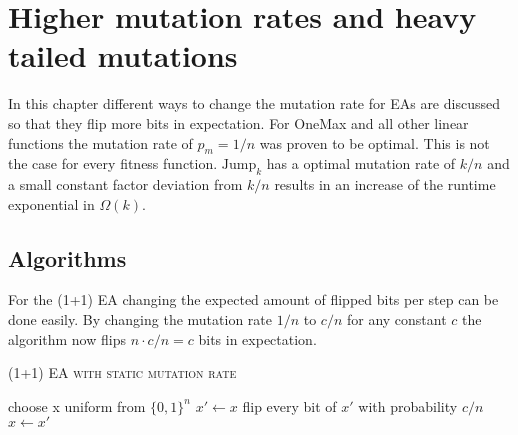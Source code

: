 \chapter{Higher mutation rates and heavy tailed mutations}\label{ch:heavyMut}

In this chapter different ways to change the mutation rate for EAs are discussed so that they flip more bits in expectation.
For OneMax and all other linear functions the mutation rate of $p_m=1/n$ was proven to be optimal\cite{witt2013tight}.
This is not the case for every fitness function.
$\text{Jump}_k$ has a optimal mutation rate of $k/n$ and a small constant factor deviation from $k/n$ results in an increase of the runtime exponential in $\Omega(k)$\cite{doerr2017fast}.

\section{Algorithms}
For the (1+1) EA changing the expected amount of flipped bits per step can be done easily.
By changing the mutation rate $1/n$ to $c/n$ for any constant $c$ the algorithm now flips $n\cdot c/n=c$ bits in expectation.
\begin{algorithm}[bt]
      \caption{\textsc{(1+1) EA with static mutation rate}}\label{alg:EA_SM}

      \DontPrintSemicolon %

      \BlankLine
      choose x uniform from ${\{0,1\}}^n$\;
      {
      $x' \leftarrow x$\;
      flip every bit of $x'$ with probability $c/n$\;
      {
      {
            $x \leftarrow x'$\;
      }
      }
      }
\end{algorithm}

